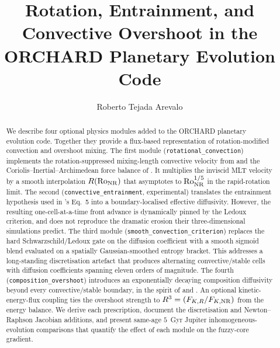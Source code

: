 \documentclass{aastex631}
\newcommand{\Roo}{\mathrm{Ro}}
\newcommand{\Rofunc}{R(\Roo_{\rm NR})}
\begin{document}
\title{Rotation, Entrainment, and Convective Overshoot in the ORCHARD Planetary Evolution Code}

\author{Roberto Tejada Arevalo}

\begin{abstract}
We describe four optional physics modules added to the ORCHARD planetary
evolution code.  Together they provide a flux-based representation of
rotation-modified convection and overshoot mixing.  The first module
(\texttt{rotational\_convection}) implements the rotation-suppressed
mixing-length convective velocity from \citet{Fuentes2023ApJL} and
the Coriolis--Inertial--Archimedean force balance of
\citet{Aurnou2020}.  It multiplies the inviscid \citeauthor{Stevenson1979}
MLT velocity by a smooth interpolation $\Rofunc$ that asymptotes to
$\Roo_{\rm NR}^{1/5}$ in the rapid-rotation limit.  The second
(\texttt{convective\_entrainment}, experimental) translates the
\citet{Linden1975} entrainment hypothesis used in
\citeauthor{Fuentes2023ApJL}'s Eq.~5 into a boundary-localised
effective diffusivity.  However, the resulting one-cell-at-a-time front
advance is dynamically pinned by the Ledoux criterion, and does not
reproduce the dramatic erosion their three-dimensional simulations
predict.  The third module
(\texttt{smooth\_convection\_criterion}) replaces the hard
Schwarzschild/Ledoux gate on the diffusion coefficient with a smooth
sigmoid blend evaluated on a spatially Gaussian-smoothed entropy
bracket.  This addresses a long-standing discretisation artefact that
produces alternating convective/stable cells with diffusion
coefficients spanning eleven orders of magnitude.  The fourth
(\texttt{composition\_overshoot}) introduces an exponentially
decaying composition diffusivity beyond every convective/stable
boundary, in the spirit of \citet{Herwig2000} and \citet{Freytag1996}.
An optional kinetic-energy-flux coupling ties the overshoot
strength to $R^3 = (F_{K,R}/F_{K,\rm NR})$ from the
\citeauthor{Fuentes2023ApJL} energy balance.  We derive each
prescription, document the discretisation and Newton--Raphson
Jacobian additions, and present same-age $5$~Gyr Jupiter
inhomogeneous-evolution comparisons that quantify the effect of each
module on the fuzzy-core gradient.
\end{abstract}


\end{document}
